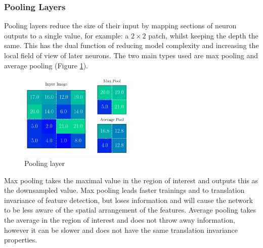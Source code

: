 \subsubsection{Pooling Layers}
Pooling layers reduce the size of their input by mapping sections of neuron outputs to a single value, for example: a $2\times{}2$ patch, whilst keeping the depth the same.
This has the dual function of reducing model complexity and increasing the local field of view of later neurons. 
The two main types used are max pooling and average pooling (Figure \ref{fig:machine_learning:pooling}). 
\begin{figure}[h!]
    \includegraphics[width=0.49\textwidth]{figures/machine_learning/pooling.pdf}
    \caption{Pooling layer}
        \label{fig:machine_learning:pooling}
\end{figure}

Max pooling takes the maximal value in the region of interest and outputs this as the downsampled value. Max pooling leads faster trainings and to translation invariance of feature detection, but loses information and will cause the network to be less aware of the spatial arrangement of the features. 
Average pooling takes the average in the region of interest and does not throw away information, however it can be slower and does not have the same translation invariance properties. 


